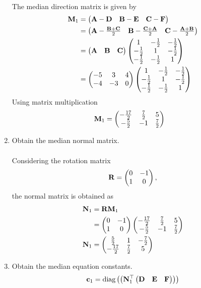 \documentclass[10pt]{book}
\begin{document}
\begin{enumerate}[label=\thesubsection.\arabic*.,ref=\thesubsection.\theenumi]
\solution \\
The median direction matrix is given by 
\begin{align}
			\mathbf{M}_1 &= \begin{pmatrix}\mathbf{A}-\mathbf{D} & \mathbf{B}-\mathbf{E} & \mathbf{C}-\mathbf{F}\end{pmatrix}
			\\
			&= 
			  \begin{pmatrix}
				  \mathbf{A}-\frac{\mathbf{B}+\mathbf{C}}{2} &
			  \mathbf{B}-\frac{\mathbf{C}+\mathbf{A}}{2} &
			  \mathbf{C}-\frac{\mathbf{A}+\mathbf{B}}{2}\end{pmatrix} 
			  \\
			  &= \begin{pmatrix}\mathbf{A} & \mathbf{B} &\mathbf{C}\end{pmatrix}
			  \begin{pmatrix}
				  1 & -\frac{1}{2} & -\frac{1}{2}
				  \\
				  -\frac{1}{2} & 1 & -\frac{1}{2}
				  \\
				  -\frac{1}{2} & -\frac{1}{2} & 1
				  \end{pmatrix} 
      \\
      &= \begin{pmatrix}-5 & 3 & 4 \\ -4 & -3 & 0\end{pmatrix}\begin{pmatrix}
				  1 & -\frac{1}{2} & -\frac{1}{2}
				  \\
				  -\frac{1}{2} & 1 & -\frac{1}{2}
				  \\
				  -\frac{1}{2} & -\frac{1}{2} & 1
				  \end{pmatrix} 
		\end{align}
  Using matrix multiplication 
  \begin{align}
   \mathbf{M}_1 &=   \begin{pmatrix}-\frac{17}{2} & \frac{7}{2} & 5 \\ -\frac{5}{2} & -1 & \frac{7}{2}\end{pmatrix}
  \end{align}
\item Obtain the median normal matrix. \\
\solution \\
Considering the rotation matrix
\begin{align}
\mathbf{R}  = \begin{pmatrix}0 & -1 \\ 1 & 0\end{pmatrix},
\end{align}
the normal matrix is obtained as
\begin{align}
\mathbf{N}_1 &= \mathbf{R}\mathbf{M}_1  \\
&=\begin{pmatrix}0 & -1 \\ 1 & 0\end{pmatrix} \begin{pmatrix}-\frac{17}{2} & \frac{7}{2} & 5 \\ -\frac{5}{2} & -1 & \frac{7}{2}\end{pmatrix} \\
\mathbf{N}_1 &=  \begin{pmatrix} \frac{5}{2} & 1 & -\frac{7}{2} \\ -\frac{17}{2} & \frac{7}{2} & 5 \end{pmatrix}
\end{align}
\item Obtain the median equation constants.
\begin{align}
\vec{c}_1 &= \text{diag}\brak{\brak{\vec{N}_1^{\top}\myvec{\vec{D} & \vec{E} & \vec{F} }}}  \\

\end{align}
\end{enumerate}
\end{document}
